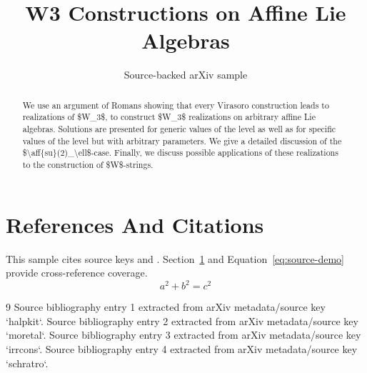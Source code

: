 \documentclass[11pt]{article}
\title{W3 Constructions on Affine Lie Algebras}
\author{Source-backed arXiv sample}
\date{}
\begin{document}
\maketitle
\begin{abstract}
We use an argument of Romans showing that every Virasoro construction leads to realizations of \$W\_3\$, to construct \$W\_3\$ realizations on arbitrary affine Lie algebras. Solutions are presented for generic values of the level as well as for specific values of the level but with arbitrary parameters. We give a detailed discussion of the \$\textbackslash{}aff\{su\}(2)\_\textbackslash{}ell\$-case. Finally, we discuss possible applications of these realizations to the construction of \$W\$-strings.
\end{abstract}
\section{References And Citations}
\label{sec:refs}
This sample cites source keys \cite{halpkit} and \cite{moretal}. Section~\ref{sec:refs} and Equation~\ref{eq:source-demo} provide cross-reference coverage.
\begin{equation}
\label{eq:source-demo}
a^2 + b^2 = c^2
\end{equation}
\begin{thebibliography}{9}
 Source bibliography entry 1 extracted from arXiv metadata/source key `halpkit`.
 Source bibliography entry 2 extracted from arXiv metadata/source key `moretal`.
 Source bibliography entry 3 extracted from arXiv metadata/source key `irrcons`.
 Source bibliography entry 4 extracted from arXiv metadata/source key `schratro`.
\end{thebibliography}
\end{document}
